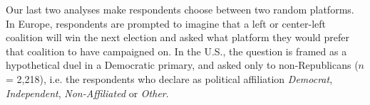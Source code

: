 


Our last two analyses make respondents choose between two random platforms. In Europe, respondents are prompted to imagine that a left or center-left coalition will win the next election and asked what platform they would prefer that coalition to have campaigned on. In the U.S., the question is framed as a hypothetical duel in a Democratic primary, and asked only to non-Republicans ($n$ = 2,218), i.e. the respondents who declare as political affiliation \textit{Democrat}, \textit{Independent}, \textit{Non-Affiliated} or \textit{Other}. 

